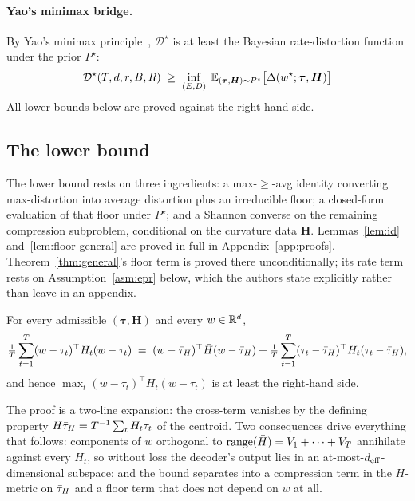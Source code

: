 \paragraph{Yao's minimax bridge.} By Yao's minimax
principle~\citep{yao1977}, $\mathcal{D}^\star$ is at least the
Bayesian rate-distortion function under the prior $P^\star$:
\begin{equation}\label{eq:yao}
  \mathcal{D}^\star(T,d,r,B,R)
  \;\geq\;
  \inf_{(E,D)}\;\mathbb{E}_{(\boldsymbol\tau,\boldsymbol H)\sim P^\star}
    \bigl[\Delta(w^\star;\boldsymbol\tau,\boldsymbol H)\bigr]
\end{equation}
All lower bounds below are proved against the right-hand side.

\subsection{The lower bound}
\label{app:rd-lower}

The lower bound rests on three ingredients: a max-$\geq$-avg identity
converting max-distortion into average distortion plus an irreducible
floor; a closed-form evaluation of that floor under $P^\star$; and a
Shannon converse on the remaining compression subproblem, conditional
on the curvature data $\boldsymbol H$. Lemmas~\ref{lem:id}
and~\ref{lem:floor-general} are proved in full in
Appendix~\ref{app:proofs}. Theorem~\ref{thm:general}'s floor term is proved
there unconditionally; its rate term rests on Assumption~\ref{asm:epr} below,
which the authors state explicitly rather than leave in an appendix.

\begin{lemma}\label{lem:id}
For every admissible $(\boldsymbol\tau, \boldsymbol H)$ and every
$w\in\mathbb{R}^d$,
\begin{equation}\label{eq:id-eq}
  \tfrac1T\sum_{t=1}^T (w-\tau_t)^\top H_t (w-\tau_t)
  \;=\; (w-\bar{\tau}_H)^\top\bar H(w-\bar{\tau}_H) + \tfrac1T\sum_{t=1}^T
  (\tau_t-\bar{\tau}_H)^\top H_t (\tau_t-\bar{\tau}_H),
\end{equation}
and hence $\max_t (w-\tau_t)^\top H_t(w-\tau_t)$ is at least the
right-hand side.
\end{lemma}

The proof is a two-line expansion: the cross-term vanishes by the
defining property $\bar H\bar{\tau}_H = T^{-1}\sum_t H_t\tau_t$ of the
centroid. Two consequences drive everything that follows: components
of $w$ orthogonal to $\operatorname{range}(\bar H) = V_1+\cdots+V_T$ annihilate
against every $H_t$, so without loss the decoder's output lies in an
at-most-$d_{\mathrm{eff}}$-dimensional subspace; and the bound separates into a
compression term in the $\bar H$-metric on $\bar{\tau}_H$ and a floor term
that does not depend on $w$ at all.

